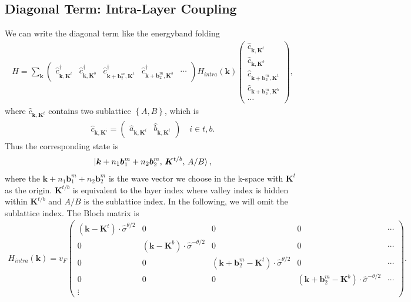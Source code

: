 \documentclass[10pt, oneside]{article}
\newcommand{\te}{\theta}
\newcommand{\p}[1]{\left(#1\right)}
\newcommand{\br}[1]{\left\{#1\right\}}
\begin{document}
\subsection{Diagonal Term: Intra-Layer Coupling}
We can write the diagonal term like the energyband folding 
\begin{align}
	H = \sum_{\bm{k}} \begin{pmatrix}
		\hat{c}^{\dagger}_{\bm{k},\bm{K}^{t}} & \hat{c}^{\dagger}_{\bm{k},\bm{K}^{b}} & \hat{c}^{\dagger}_{\bm{k} + \bm{b}^{m}_{2}, \bm{K}^{t}} & \hat{c}^{\dagger}_{\bm{k} + \bm{b}^{m}_{2},\bm{K}^{b}} & \cdots
	\end{pmatrix}
	H_{intra}\p{\bm{k}}
	\begin{pmatrix}
		\hat{c}_{\bm{k},\bm{K}^{t}} \\ \hat{c}_{\bm{k},\bm{K}^{b}} \\ \hat{c}_{\bm{k} + \bm{b}^{m}_{2}, \bm{K}^{t}} \\ \hat{c}_{\bm{k} + \bm{b}^{m}_{2},\bm{K}^{b}} \\ \cdots
	\end{pmatrix},
\end{align}
where \(\hat{c}_{\bm{k},\bm{K}^{t}}\) contains two sublattice \(\br{A, B}\), which is 
\begin{align}
	\hat{c}_{\bm{k},\bm{K}^{i}} = \begin{pmatrix}
		\hat{a}_{\bm{k},\bm{K}^{i}} & \hat{b}_{\bm{k},\bm{K}^{i}}
	\end{pmatrix}  \quad i \in {t, b}.
\end{align}
Thus the corresponding state is 
\begin{align}
	\ket{\bm{k} + n_1 \bm{b}^{m}_{1} + n_2 \bm{b}^{m}_{2},\, \bm{K}^{t/b}, \, A/B},
\end{align}
where the \(\bm{k} + n_1 \bm{b}^{m}_{1} + n_2 \bm{b}^{m}_{2}\) is the wave vector we choose in the k-space with \(\bm{K}^{t}\) as the origin. \(\bm{K}^{t/b}\) is equivalent to the layer index where valley index is hidden within \(\bm{K}^{t/b}\) and \(A/B\) is the sublattice index. In the following, we will omit the sublattice index. The Bloch matrix is 
\begin{align}
	H_{intra}\p{\bm{k}} = v_{F}	\begin{pmatrix}
		\p{\bm{k} - \bm{K}^{t}} \cdot\hat{\sigma}^{\te/2} & 0 & 0 & 0 & \cdots \\
		0 &  \p{\bm{k} - \bm{K}^{b}} \cdot \hat{\sigma}^{- \te/2}& 0 & 0 &  \cdots \\
		0 & 0 & \p{\bm{k} + \bm{b}^{m}_{2} - \bm{K}^{t}} \cdot \hat{\sigma}^{\te/2} & 0 &  \cdots \\
		0 & 0 & 0 & \p{\bm{k} + \bm{b}^{m}_{2} - \bm{K}^{b}} \cdot \hat{\sigma}^{- \te/2} & \cdots \\
		\vdots
	\end{pmatrix} .
\end{align}
\end{document}
